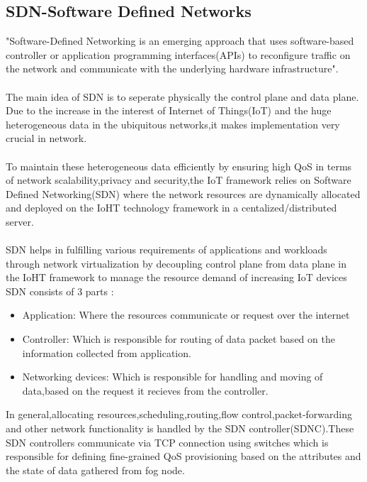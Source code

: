 \subsection{SDN-Software Defined Networks}
"Software-Defined Networking is an emerging approach that uses software-based controller or application programming interfaces(APIs) to reconfigure traffic on the network and communicate with the underlying hardware infrastructure\cite{vm}".\\ \\
The main idea of SDN is to seperate physically the control plane and data plane\cite{11}.\\
Due to the increase in the interest of Internet of Things(IoT) and the huge heterogeneous data in the ubiquitous networks,it makes implementation very crucial in network.\\ \\
To maintain these heterogeneous data efficiently by ensuring high QoS in terms of network scalability,privacy and security,the IoT framework relies on Software Defined Networking(SDN)\cite{3} where the network resources are dynamically allocated and deployed on the IoHT technology framework in a centalized/distributed server.\\ \\
SDN helps in fulfilling various requirements of applications and workloads through network virtualization by decoupling control plane from data plane in the IoHT framework to manage the resource demand of increasing IoT devices\cite{3}\cite{haque2016wireless} \\
SDN consists of 3 parts :
\begin{itemize}
	\item Application: Where the resources communicate or request over the internet
	\item Controller: Which is responsible for routing of data packet based on the information collected from application.
	\item Networking devices: Which is responsible for handling and moving of data,based on the request it recieves from the controller.
\end{itemize}
In general,allocating resources,scheduling,routing,flow control,packet-forwarding and other network functionality is handled by the SDN controller(SDNC).These SDN controllers communicate via TCP connection using switches which is responsible for defining fine-grained QoS provisioning based on the attributes and the state of data gathered from fog node\cite{11}.\\  \\
